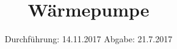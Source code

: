 

\subject{v206}
\title{Wärmepumpe}
\date{%
  Durchführung: 14.11.2017
  \hspace{3em}
  Abgabe: 21.7.2017
}



\maketitle
\thispagestyle{empty}
\tableofcontents
\newpage






\printbibliography{}



